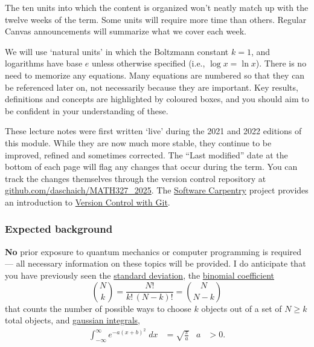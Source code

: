 The ten units into which the content is organized won't neatly match up with the twelve weeks of the term.
Some units will require more time than others.
Regular Canvas announcements will summarize what we cover each week.

We will use `natural units' in which the Boltzmann constant $k = 1$, and logarithms have base $e$ unless otherwise specified (i.e., $\log x = \ln x$).
There is no need to memorize any equations.
Many equations are numbered so that they can be referenced later on, not necessarily because they are important.
Key results, definitions and concepts are highlighted by coloured boxes, and you should aim to be confident in your understanding of these.

These lecture notes were first written `live' during the 2021 and 2022 editions of this module.
While they are now much more stable, they continue to be improved, refined and sometimes corrected.
The ``Last modified'' date at the bottom of each page will flag any changes that occur during the term.
You can track the changes themselves through the version control repository at \href{https://github.com/daschaich/MATH327_2025}{github.com/daschaich/MATH327\_2025}.
The \href{https://software-carpentry.org}{Software Carpentry} project provides an introduction to \href{https://swcarpentry.github.io/git-novice/}{Version Control with Git}.

\subsubsection*{Expected background}
\textbf{No} prior exposure to quantum mechanics or computer programming is required --- all necessary information on these topics will be provided.
I do anticipate that you have previously seen the \href{https://en.wikipedia.org/wiki/Standard_deviation}{standard deviation}, the \href{https://en.wikipedia.org/wiki/Binomial_coefficient}{binomial coefficient}
\begin{equation*}
  \binom{N}{k} = \frac{N!}{k! \, (N - k)!} = \binom{N}{N - k}
\end{equation*}
that counts the number of possible ways to choose $k$ objects out of a set of $N \geq k$ total objects, and \href{https://en.wikipedia.org/wiki/Gaussian_integral}{gaussian integrals},
\begin{align*} %
  \int_{-\infty}^{\infty} e^{-a (x + b)^2} \; dx & = \sqrt{\frac{\pi}{a}} &
  a & > 0.
\end{align*}

